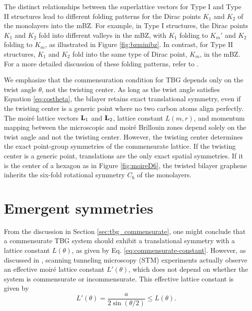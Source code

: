 The distinct relationships between the superlattice vectors for Type I and Type II structures lead to different folding patterns for the Dirac points \(K_1\) and \(K_2\) of the monolayers into the mBZ. For example, in Type I structures, the Dirac points \(K_1\) and \(K_2\) fold into different valleys in the mBZ, with \(K_1\) folding to \(K_m'\) and \(K_2\) folding to \(K_m\), as illustrated in Figure \ref{fig:bzminibz}. In contrast, for Type II structures, \(K_1\) and \(K_2\) fold into the same type of Dirac point, \(K_m\), in the mBZ. For a more detailed discussion of these folding patterns, refer to \cite{zou2018}.


We emphasize that the commensuration condition for TBG depends only on the twist angle $\theta$, not the twisting center. As long as the twist angle satisfies Equation \ref{eq:costheta}, the bilayer retains exact translational symmetry, even if the twisting center is a generic point where no two carbon atoms align perfectly. The moiré lattice vectors $\vb{L}_1$ and $\vb{L}_2$, lattice constant \( L(m, r) \), and momentum mapping between the microscopic and moiré Brillouin zones depend solely on the twist angle and not the twisting center. However, the twisting center determines the exact point-group symmetries of the commensurate lattice. If the twisting center is a generic point, translations are the only exact spatial symmetries. If it is the center of a hexagon as in Figure \ref{fig:moireD6}, the twisted bilayer graphene inherits the six-fold rotational symmetry \( C_6 \) of the monolayers.

\section{Emergent symmetries} \label{sec:emergent_symm}

From the discussion in Section \ref{sec:tbg_commensurate}, one might conclude that a commensurate TBG system should exhibit a translational symmetry with a lattice constant \( L(\theta) \), as given by Eq. \eqref{eq:commensurate-constant}. However, as discussed in \cite{zou2018}, scanning tunneling microscopy (STM) experiments actually observe an effective moiré lattice constant \( L'(\theta) \), which does not depend on whether the system is commensurate or incommensurate. This effective lattice constant is given by
\begin{equation} \label{eq:STM-constant}
L'(\theta) = \frac{a}{2 \sin(\theta/2)} \leq L(\theta).
\end{equation}

